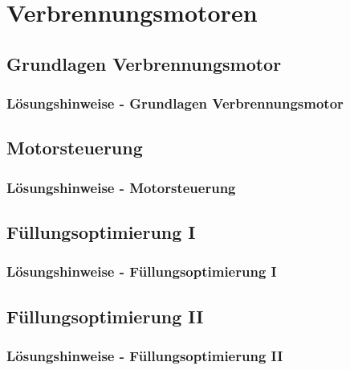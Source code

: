 


\part{Verbrennungsmotoren}
\chapter{Grundlagen Verbrennungsmotor}
 \newpage
\section{Lösungshinweise - Grundlagen Verbrennungsmotor}

\chapter{Motorsteuerung}
 \newpage
\section{Lösungshinweise - Motorsteuerung}

\chapter{Füllungsoptimierung I}
 \newpage
\section{Lösungshinweise - Füllungsoptimierung I}

\chapter{Füllungsoptimierung II}
 \newpage
\section{Lösungshinweise - Füllungsoptimierung II}

